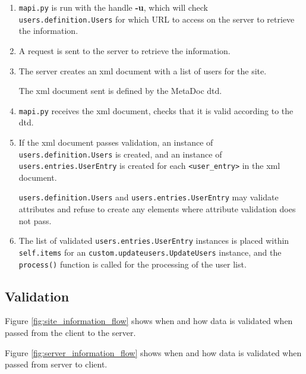 \begin{enumerate}
    \item
        \texttt{mapi.py} is run with the handle \textbf{-u}, which will check
        \texttt{users.definition.Users} for which URL to access on the server
        to retrieve the information.
    \item
        A request is sent to the server to retrieve the information.
    \item
        The server creates an \gls{xml} document with a list of users for the
        site.
        
        The \gls{xml} document sent is defined by the MetaDoc \gls{dtd}.
    \item
        \texttt{mapi.py} receives the \gls{xml} document, checks that it is
        valid according to the \gls{dtd}. 
    \item
        If the \gls{xml} document passes validation, an instance of
        \texttt{users.definition.Users} is created, and an instance of
        \texttt{users.entries.UserEntry} is created for each
        \texttt{<user\_entry>} in the \gls{xml} document.

        \texttt{users.definition.Users} and \texttt{users.entries.UserEntry}
        may validate attributes and refuse to create any elements where
        attribute validation does not pass.
    \item
        The list of validated \texttt{users.entries.UserEntry} instances is
        placed within \texttt{self.items} for an
        \texttt{custom.updateusers.UpdateUsers} instance, and the
        \texttt{process()} function is called for the processing of the user
        list.
\end{enumerate}

\subsection{Validation}

Figure \ref{fig:site_information_flow} shows when and how data is validated
when passed from the client to the server. 

Figure \ref{fig:server_information_flow} shows when and how data is validated
when passed from server to client.

